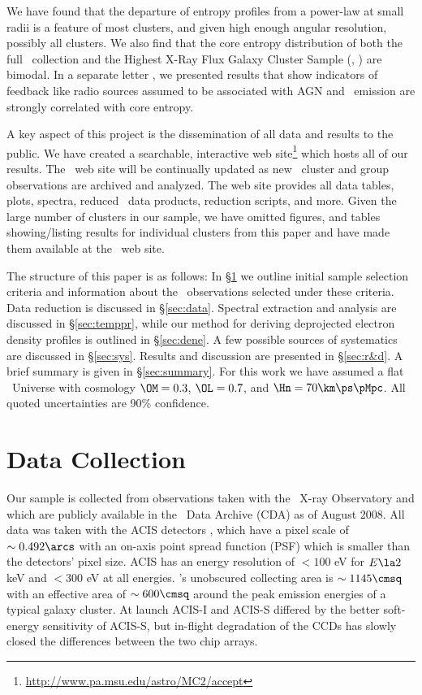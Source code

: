 \documentclass{emulateapj}
\begin{document}
We have found that the departure of entropy profiles from a power-law
at small radii is a feature of most clusters, and given high enough
angular resolution, possibly all clusters. We also find that the core
entropy distribution of both the full \accept\ collection and the
Highest X-Ray Flux Galaxy Cluster Sample (\hifl, \citealt{hiflugcs1,
  hiflugcs2}) are bimodal. In a separate letter \citep{haradent}, we
presented results that show indicators of feedback like radio sources
assumed to be associated with AGN and \halpha\ emission are strongly
correlated with core entropy.

A key aspect of this project is the dissemination of all data and
results to the public. We have created a searchable, interactive web
site\footnote{\url{http://www.pa.msu.edu/astro/MC2/accept}} which
hosts all of our results. The \accept\ web site will be continually
updated as new \chandra\ cluster and group observations are archived
and analyzed. The web site provides all data tables, plots, spectra,
reduced \chandra\ data products, reduction scripts, and more. Given
the large number of clusters in our sample, we have omitted figures,
and tables showing/listing results for individual clusters from this
paper and have made them available at the \accept\ web site.

The structure of this paper is as follows: In \S\ref{sec:sample} we
outline initial sample selection criteria and information about the
\chandra\ observations selected under these criteria. Data reduction
is discussed in \S\ref{sec:data}. Spectral extraction and analysis are
discussed in \S\ref{sec:temppr}, while our method for deriving
deprojected electron density profiles is outlined in
\S\ref{sec:dene}. A few possible sources of systematics are discussed
in \S\ref{sec:sys}. Results and discussion are presented in
\S\ref{sec:r&d}. A brief summary is given in \S\ref{sec:summary}. For
this work we have assumed a flat \LCDM\ Universe with cosmology
$\OM=0.3$, $\OL=0.7$, and $\Hn=70\km\ps\pMpc$. All quoted
uncertainties are 90\% confidence.

\section{Data Collection}
\label{sec:sample}

Our sample is collected from observations taken with the
\chandra\ X-ray Observatory \citep{chandra} and which are publicly
available in the \chandra\ Data Archive (CDA) as of August 2008. All
data was taken with the ACIS detectors \citep{acis}, which have a
pixel scale of $\sim 0.492\arcs$ with an on-axis point spread function
(PSF) which is smaller than the detectors' pixel size. ACIS has an
energy resolution of $< 100$ eV for $E \la 2$ keV and $< 300$ eV at
all energies. \chandra's unobscured collecting area is $\sim 1145
\cmsq$ with an effective area of $\sim 600 \cmsq$ around the peak
emission energies of a typical galaxy cluster. At launch ACIS-I and
ACIS-S differed by the better soft-energy sensitivity of ACIS-S, but
in-flight degradation of the CCDs has slowly closed the differences
between the two chip arrays.
\end{document}
